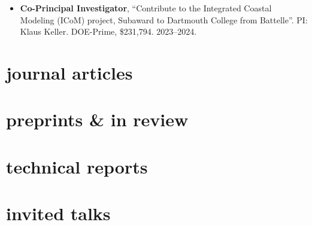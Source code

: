 \documentclass[10pt,oneside]{article}
\begin{document}
\mbox{}\vspace{-\dimexpr\baselineskip\relax}

\begin{itemize}[label={}]
  
  \item \textbf{Co-Principal Investigator}, \enquote{Contribute to the Integrated Coastal Modeling (ICoM) project, Subaward to Dartmouth College from Battelle}.  PI: Klaus Keller. {DOE-Prime}, \$231,794. 2023--2024.
        
\end{itemize}


\section{journal articles}

\mbox{}\vspace{-\dimexpr\baselineskip\relax}
\vspace*{-1em}

\uspunctuation

\printbibliography[type=article, heading=none]

\section{preprints \& in review}

\mbox{}\vspace{-\dimexpr\baselineskip\relax}
\vspace*{-1em}
\printbibliography[type=unpublished, heading=none]

\section{technical reports}

\mbox{}\vspace{-\dimexpr\baselineskip\relax}
\vspace*{-1em}
\printbibliography[type=report, heading=none]


\section{invited talks}

\mbox{}\vspace{-\dimexpr\baselineskip\relax}
\end{document}
